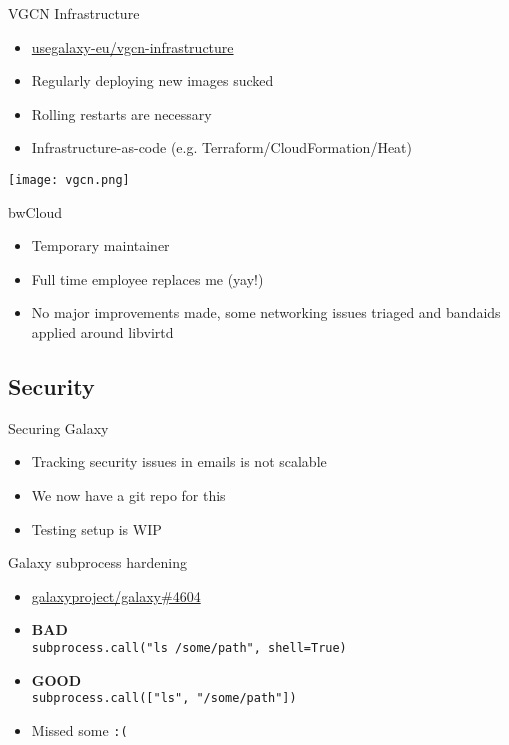 \documentclass[12pt]{ufrslides}
\newcommand{\ghpr}[3]{\href{https://github.com/#1/#2/pull/#3}{#1/#2\##3}}
\newcommand{\ghproject}[2]{\href{https://github.com/#1/#2/}{#1/#2}}
\begin{document}
	\begin{frame}{VGCN Infrastructure}
		\begin{itemize}
			\item \ghproject{usegalaxy-eu}{vgcn-infrastructure}
			\item Regularly deploying new images sucked
			\item Rolling restarts are necessary
			\item Infrastructure-as-code (e.g. Terraform/CloudFormation/Heat)
		\end{itemize}
		\texttt{[image: vgcn.png]}
	\end{frame}

	\begin{frame}{bwCloud}
		\begin{itemize}
			\item Temporary maintainer
			\item Full time employee replaces me (yay!)
			\item No major improvements made, some networking issues triaged and bandaids applied around libvirtd
		\end{itemize}
	\end{frame}

\subsection{Security}

	\begin{frame}{Securing Galaxy}
		\begin{itemize}
			\item Tracking security issues in emails is not scalable
			\item We now have a git repo for this
			\item Testing setup is WIP
		\end{itemize}
	\end{frame}

	\begin{frame}{Galaxy subprocess hardening}
		\begin{itemize}
			\item \ghpr{galaxyproject}{galaxy}{4604}
			\item \textbf{BAD}\\ \texttt{subprocess.call("ls /some/path", shell=True)}
			\item \textbf{GOOD}\\ \texttt{subprocess.call(["ls", "/some/path"])}
			\item Missed some \texttt{:(}
		\end{itemize}
	\end{frame}
\end{document}
